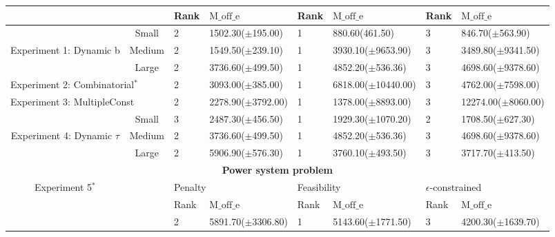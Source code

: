\documentclass[review]{elsarticle}
\begin{document}
\begin{table*}[t]
{\begin{tabular}{cc|llllll}
                                  &        & Rank & $\text{M\_off\_e}$ & Rank & $\text{M\_off\_e}$   & Rank & $\text{M\_off\_e}$                                \\\hline
                                  & Small  & 2    & 1502.30($\pm$195.00)       & 1    & 880.60(461.50)           & 3    & 846.70($\pm$563.90)                                       \\
Experiment 1: Dynamic b                         & Medium & 2    & 1549.50($\pm$239.10)       & 1    & 3930.10($\pm$9653.90)        & 3    & 3489.80($\pm$9341.50)                                     \\
                                  & Large  & 2    & 3736.60($\pm$499.50)       & 1    & 4852.20($\pm$536.36)         & 3    & 4698.60($\pm$9378.60)                                     \\
\multicolumn{2}{l|}{Experiment 2: Combinatorial$^*$}          & 2    & 3093.00($\pm$385.00)       & 1    & 6818.00($\pm$10440.00)       & 3    & 4762.00($\pm$7598.00)                                     \\
\multicolumn{2}{l|}{Experiment 3: MultipleConst}          & 2    & 2278.90($\pm$3792.00)      & 1    & 1378.00($\pm$8893.00)        & 3    & 12274.00($\pm$8060.00)                                    \\
                                  & Small  & 3    & 2487.30($\pm$456.50)       & 1    & 1929.30($\pm$1070.20)        & 2    & 1708.50($\pm$627.30)                                      \\
Experiment 4: Dynamic $\tau$       & Medium & 2    & 3736.60($\pm$499.50)       & 1    & 4852.20($\pm$536.36)         & 3    & 4698.60($\pm$9378.60)                                     \\
                                  & Large  & 2    & 5906.90($\pm$576.30)       & 1    & 3760.10($\pm$493.50)         & 3    & 3717.70($\pm$413.50)                                      \\\hline
\multicolumn{8}{c}{\textbf{Power system problem}}                                                                                                                                   \\\hline
 Experiment 5$^*$              &         & \multicolumn{2}{l}{Penalty}   & \multicolumn{2}{l}{Feasibility} & \multicolumn{2}{l}{$\epsilon$-constrained}  \\
                                  &        & Rank & $\text{M\_off\_e}$ & Rank & $\text{M\_off\_e}$   & Rank & $\text{M\_off\_e}$                                \\\hline
                                  &        & 2    & 5891.70($\pm$3306.80)      & 1    & 5143.60($\pm$1771.50)         & 3    & 4200.30($\pm$1639.70)                                      \\
\end{tabular}
}
\end{table*}
\end{document}
